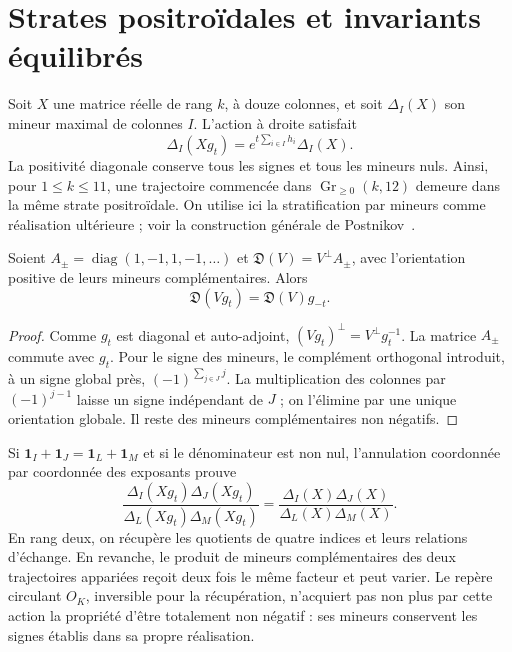 \section{Strates positroïdales et invariants équilibrés}

Soit \(X\) une matrice réelle de rang \(k\), à douze colonnes, et soit \(\Delta_I(X)\) son mineur maximal de colonnes \(I\). L'action à droite satisfait
\begin{equation}
 \Delta_I(Xg_t)=e^{t\sum_{i\in I}h_i}\Delta_I(X).
 \label{x_reciprocidad:rec:eq:plucker}
\end{equation}
La positivité diagonale conserve tous les signes et tous les mineurs nuls. Ainsi, pour \(1\le k\le11\), une trajectoire commencée dans \(\operatorname{Gr}_{\ge0}(k,12)\) demeure dans la même strate positroïdale. On utilise ici la stratification par mineurs comme réalisation ultérieure ; voir la construction générale de Postnikov~\cite{x_reciprocidad:rec:postnikov}.

\begin{proposition}
Soient \(A_{\pm}=\operatorname{diag}(1,-1,1,-1,\ldots)\) et
\(\mathfrak D(V)=V^\perp A_{\pm}\), avec l’orientation positive de leurs mineurs complémentaires. Alors
\[
 \mathfrak D(Vg_t)=\mathfrak D(V)g_{-t}.
\]
\end{proposition}
\begin{proof}
Comme \(g_t\) est diagonal et auto-adjoint,
\((Vg_t)^\perp=V^\perp g_t^{-1}\). La matrice \(A_{\pm}\) commute avec \(g_t\). Pour le signe des mineurs, le complément orthogonal introduit, à un signe global près, \((-1)^{\sum_{j\in J}j}\). La multiplication des colonnes par \((-1)^{j-1}\) laisse un signe indépendant de \(J\) ; on l’élimine par une unique orientation globale. Il reste des mineurs complémentaires non négatifs.
\end{proof}

Si \(\mathbf1_I+\mathbf1_J=\mathbf1_L+\mathbf1_M\) et si le dénominateur est non nul, l’annulation coordonnée par coordonnée des exposants prouve
\begin{equation}
 \frac{\Delta_I(Xg_t)\Delta_J(Xg_t)}{\Delta_L(Xg_t)\Delta_M(Xg_t)}
 =\frac{\Delta_I(X)\Delta_J(X)}{\Delta_L(X)\Delta_M(X)}.
 \label{x_reciprocidad:rec:eq:cocientes}
\end{equation}
En rang deux, on récupère les quotients de quatre indices et leurs relations d'échange. En revanche, le produit de mineurs complémentaires des deux trajectoires appariées reçoit deux fois le même facteur et peut varier. Le repère circulant \(O_K\), inversible pour la récupération, n'acquiert pas non plus par cette action la propriété d'être totalement non négatif : ses mineurs conservent les signes établis dans sa propre réalisation.

